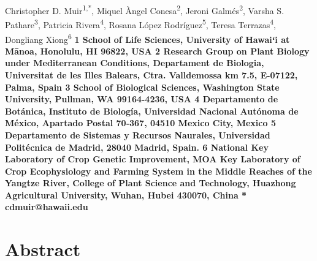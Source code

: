 \documentclass[
  10pt,
]{article}
\author{}
\date{\vspace{-2.5em}}
\makeatletter
\newcommand\iraggedright{%
  \let\\\@centercr\@rightskip\@flushglue \rightskip\@rightskip
  \leftskip\z@skip}
\makeatother
\begin{document}
\iraggedright

\begin{flushleft}
{\Large
\textbf{}
}
\newline
\\
Christopher D. Muir\textsuperscript{1,*},
Miquel \`{A}ngel Conesa\textsuperscript{2},
Jeroni Galm\'{e}s\textsuperscript{2},
Varsha S. Pathare\textsuperscript{3},
Patricia Rivera\textsuperscript{4},
Rosana López Rodríguez\textsuperscript{5},
Teresa Terrazas\textsuperscript{4},
Dongliang Xiong\textsuperscript{6}
\\
\bigskip
\bf{1} School of Life Sciences, University of Hawaiʻi at M\=anoa, Honolulu, HI 96822, USA \\
\bf{2} Research Group on Plant Biology under Mediterranean Conditions, Departament de Biologia, Universitat de les Illes Balears, Ctra. Valldemossa km 7.5, E-07122, Palma, Spain \\
\bf{3} School of Biological Sciences, Washington State University, Pullman, WA 99164-4236, USA \\
\bf{4} Departamento de Botánica, Instituto de Biología, Universidad Nacional Autónoma de México, Apartado Postal 70‑367, 04510 Mexico City, Mexico \\
\bf{5} Departamento de Sistemas y Recursos Naurales, Universidad Politécnica de Madrid, 28040 Madrid, Spain. \\
\bf{6} National Key Laboratory of Crop Genetic Improvement, MOA Key Laboratory of Crop Ecophysiology and Farming System in the Middle Reaches of the Yangtze River, College of Plant Science and Technology, Huazhong Agricultural University, Wuhan, Hubei 430070, China\\
\bigskip
* cdmuir@hawaii.edu

\end{flushleft}

\hypertarget{abstract}{%
\section{Abstract}\label{abstract}}
\end{document}
